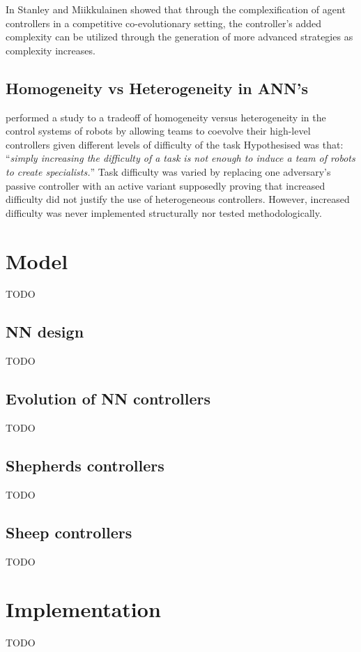 \documentclass[conference]{IEEEtran}
\begin{document}
In \cite{stanley2004competitive} Stanley and Miikkulainen showed that through the complexification of agent controllers in a competitive co-evolutionary setting, the controller's added complexity can be utilized through the generation of more advanced strategies as complexity increases.


\subsection{Homogeneity vs Heterogeneity in ANN's}
\cite{potter2001heterogeneity} performed a study to a tradeoff of homogeneity versus heterogeneity in the control systems of robots by allowing teams to coevolve their high-level controllers given different levels of difficulty of the task
Hypothesised was that: ``\textit{simply increasing the difficulty of a task is not enough to induce a team of robots to create specialists.}''
Task difficulty was varied by replacing one adversary's passive controller with an active variant supposedly proving that increased difficulty did not justify the use of heterogeneous controllers.
However, increased difficulty was never implemented structurally nor tested methodologically. 



\section{Model}
TODO

\subsection{NN design}
TODO

\subsection{Evolution of NN controllers}
TODO

\subsection{Shepherds controllers}
TODO

\subsection{Sheep controllers}
TODO

\section{Implementation}
TODO
\end{document}

